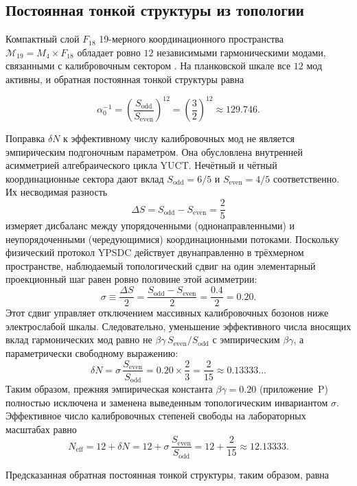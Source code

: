 \documentclass[12pt,a4paper]{article}
\theoremstyle{remark}
\begin{document}
	\subsection{Постоянная тонкой структуры из топологии}
	
	Компактный слой \(F_{18}\) 19-мерного координационного пространства \(\mathcal{M}_{19}=M_4\times F_{18}\) обладает ровно \(12\) независимыми гармоническими модами, связанными с калибровочным сектором \cite{AppendixG}. На планковской шкале все \(12\) мод активны, и обратная постоянная тонкой структуры равна
	
	\begin{equation}
		\alpha_0^{-1} = \left(\frac{S_{\mathrm{odd}}}{S_{\mathrm{even}}}\right)^{12}
		= \left(\frac{3}{2}\right)^{12} \approx 129.746 .
	\end{equation}
	
	Поправка \(\delta N\) к эффективному числу калибровочных мод не является эмпирическим подгоночным параметром. Она обусловлена внутренней асимметрией алгебраического цикла YUCT. Нечётный и чётный координационные сектора дают вклад \(S_{\mathrm{odd}} = 6/5\) и \(S_{\mathrm{even}} = 4/5\) соответственно. Их несводимая разность
	\[
	\Delta S = S_{\mathrm{odd}} - S_{\mathrm{even}} = \frac{2}{5}
	\]
	измеряет дисбаланс между упорядоченными (однонаправленными) и неупорядоченными (чередующимися) координационными потоками. Поскольку физический протокол YPSDC действует двунаправленно в трёхмерном пространстве, наблюдаемый топологический сдвиг на один элементарный проекционный шаг равен ровно половине этой асимметрии:
	\[
	\sigma \equiv \frac{\Delta S}{2} = \frac{S_{\mathrm{odd}} - S_{\mathrm{even}}}{2}
	= \frac{0.4}{2} = 0.20.
	\]
	Этот сдвиг управляет отключением массивных калибровочных бозонов ниже электрослабой шкалы. Следовательно, уменьшение эффективного числа вносящих вклад гармонических мод равно не \(\beta\gamma\,S_{\mathrm{even}}/S_{\mathrm{odd}}\) с эмпирическим \(\beta\gamma\), а параметрически свободному выражению:
	\[
	\delta N = \sigma \, \frac{S_{\mathrm{even}}}{S_{\mathrm{odd}}}
	= 0.20 \times \frac{2}{3}
	= \frac{2}{15} \approx 0.13333\ldots
	\]
	Таким образом, прежняя эмпирическая константа \(\beta\gamma = 0.20\) (приложение~P) полностью исключена и заменена выведенным топологическим инвариантом \(\sigma\). Эффективное число калибровочных степеней свободы на лабораторных масштабах равно
	\[
	N_{\mathrm{eff}} = 12 + \delta N = 12 + \sigma\,\frac{S_{\mathrm{even}}}{S_{\mathrm{odd}}}
	= 12 + \frac{2}{15} \approx 12.13333 .
	\]
	
	Предсказанная обратная постоянная тонкой структуры, таким образом, равна
	
\end{document}
